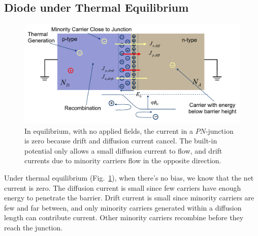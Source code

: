 \subsection{Diode under Thermal Equilibrium}
\begin{figure}[tb]
\centering
\includegraphics[width=.75\columnwidth]{slide35}
\caption{In equilibrium, with no applied fields, the current in a $PN$-junction is zero because drift and diffusion current cancel.  The built-in potential only allows a small diffusion current to flow, and drift currents due to minority carriers flow in the opposite direction.}
\label{fig:slide35}
\end{figure}
Under thermal equilibrium (Fig.~\ref{fig:slide35}), when there's no bias, we know that the net current is zero.  The diffusion current is small since few carriers have enough energy to penetrate the barrier.   Drift current is small since minority carriers are few and far between, and only minority carriers generated within a diffusion length can contribute current.  Other minority carriers recombine before they reach the junction.

